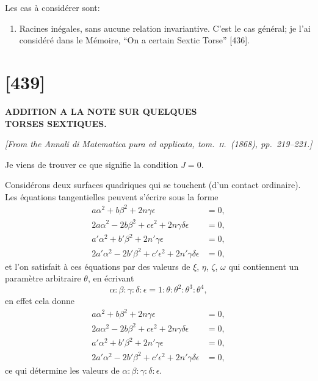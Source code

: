 \documentclass[11pt,a4paper]{article}
\begin{document}
Les cas \`{a} consid\'{e}rer sont:
\begin{enumerate}[label=$\circ$]
\item Racines in\'{e}gales, sans aucune relation invariantive. C'est le cas g\'{e}n\'{e}ral; je l'ai consid\'{e}r\'{e} dans le M\'{e}moire, ``On a certain Sextic Torse'' [436].
\end{enumerate}

\newpage
\section*{[439]}

\begin{center}
\textbf{\Large ADDITION A LA NOTE SUR QUELQUES\\TORSES SEXTIQUES.}
\end{center}

\begin{flushright}
\textit{[From the \textit{Annali di Matematica pura ed applicata}, tom.\ \textsc{ii}.\ (1868), pp.\ 219--221.]}
\end{flushright}

\vspace{1em}

\noindent
Je viens de trouver ce que signifie la condition $J = 0$.

Consid\'{e}rons deux surfaces quadriques qui se touchent (d'un contact ordinaire). Les \'{e}quations tangentielles peuvent s'\'{e}crire sous la forme
\begin{align*}
a\alpha^2 + b\beta^2 + 2n\gamma\epsilon &= 0, \\
2a\alpha^2 - 2b\beta^2 + c\epsilon^2 + 2n\gamma\delta\epsilon &= 0, \\
a'\alpha^2 + b'\beta^2 + 2n'\gamma\epsilon &= 0, \\
2a'\alpha^2 - 2b'\beta^2 + c'\epsilon^2 + 2n'\gamma\delta\epsilon &= 0,
\end{align*}
et l'on satisfait \`{a} ces \'{e}quations par des valeurs de $\xi$, $\eta$, $\zeta$, $\omega$ qui contiennent un param\`{e}tre arbitraire $\theta$, en \'{e}crivant
\[
\alpha : \beta : \gamma : \delta : \epsilon = 1 : \theta : \theta^2 : \theta^3 : \theta^4,
\]
en effet cela donne
\begin{align*}
a\alpha^2 + b\beta^2 + 2n\gamma\epsilon &= 0, \\
2a\alpha^2 - 2b\beta^2 + c\epsilon^2 + 2n\gamma\delta\epsilon &= 0, \\
a'\alpha^2 + b'\beta^2 + 2n'\gamma\epsilon &= 0, \\
2a'\alpha^2 - 2b'\beta^2 + c'\epsilon^2 + 2n'\gamma\delta\epsilon &= 0,
\end{align*}
ce qui d\'{e}termine les valeurs de $\alpha : \beta : \gamma : \delta : \epsilon$.
\end{document}
